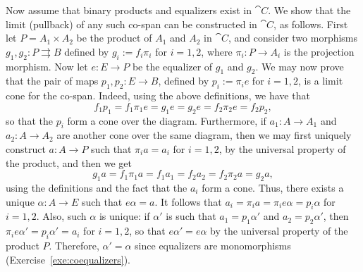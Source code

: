 Now assume that binary products and equalizers exist in
$\cat{C}$. We show that the limit (pullback) of any such co-span can be constructed
in $\cat{C}$, as follows. First let $P = A_1 \times A_2$ be the product of $A_1$
and $A_2$ in $\cat{C}$, and consider two morphisms $g_1, g_2 \colon P
\rightrightarrows B$ defined by $g_i := f_i \pi_i$ for $i = 1, 2$, where $\pi_i
\colon P \to A_i$ is the projection morphism. Now let $e \colon E \to P$ be the
equalizer of $g_1$ and $g_2$. We may now prove that the pair of maps $p_1, p_2
\colon E \to B$, defined by $p_i := \pi_i e$ for $i = 1, 2$, is a limit cone for
the co-span. Indeed, using the above definitions, we have that
\[ f_1 p_1 = f_1 \pi_1 e = g_1 e = g_2 e = f_2 \pi_2 e = f_2 p_2,\]
so that the $p_i$ form a cone over the diagram. Furthermore, if $a_1 \colon A \to A_1$ and $a_2 \colon A \to A_2$ are another cone over the same diagram, then we may first uniquely construct $a \colon A \to P$ such that $\pi_i a = a_i$ for $i = 1,2$, by the universal property of the product, and then we get
\[ g_1 a = f_1 \pi_1 a = f_1 a_1 = f_2 a_2 = f_2 \pi_2 a = g_2 a,\]
using the definitions and the fact that the $a_i$ form a cone. Thus, there exists a unique $\alpha \colon A \to E$ such that $e \alpha = a$. It follows that $a_i = \pi_i a = \pi_i e \alpha = p_i \alpha$ for $i = 1, 2$. Also, such $\alpha$ is unique: if $\alpha'$ is such that $a_1 = p_1 \alpha'$ and $a_2 = p_2\alpha'$, then $\pi_i e \alpha' = p_i \alpha' = a_i$ for $i = 1, 2$, so that $e \alpha' = e \alpha$ by the universal property of the product $P$. Therefore, $\alpha' = \alpha$ since equalizers are monomorphisms (Exercise~\ref{exe:coequalizers}). 

